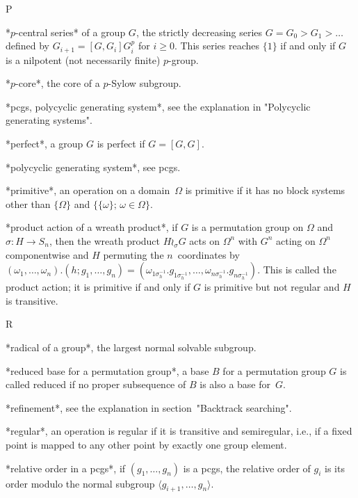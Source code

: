  P

*$p$-central series* of a group $G$, the strictly  decreasing series $G =
G_0 > G_1 > \ldots$ defined by $G_{i+1} = [G,G_i]G_i^p$ for $i\ge0$. This
series reaches $\{1\}$ if and only if $G$ is a nilpotent (not necessarily
finite) $p$-group.

*$p$-core*, the core of a $p$-Sylow subgroup.

*pcgs, polycyclic generating  system*, see the explanation in "Polycyclic
generating systems".

*perfect*, a group $G$ is perfect if $G=[G,G]$.

*polycyclic generating system*, see pcgs.

*primitive*, an operation on a domain~$\Omega$ is primitive  if it has no
block  systems other  than   $\{\Omega\}$  and  $\{\{\omega\};\,\omega\in
\Omega\}$.

*product  action of a wreath  product*, if $G$  is a permutation group on
$\Omega$  and    $\sigma\colon H\to    S_n$,   then  the  wreath  product
$H\wr_\sigma G$ acts   on  $\Omega^n$ with  $G^n$  acting on   $\Omega^n$
componentwise     and      $H$  permuting     the    $n$~coordinates   by
$(\omega_1,\ldots,\omega_n).               (h;g_1,\ldots,g_n)           =
(\omega_{1\sigma_h^{-1}}.             g_{1\sigma_h^{-1}},         \ldots,
\omega_{n\sigma_h^{-1}}. g_{n\sigma_h^{-1}})$. This is called the product
action; it is primitive if  and only if  $G$ is primitive but not regular
and $H$ is transitive.

 R

*radical of a group*, the largest normal solvable subgroup.

*reduced  base  for a permutation group*,  a  base  $B$ for a permutation
group  $G$ is called reduced  if no proper subsequence of  $B$  is also a
base for~$G$.

*refinement*, see the explanation in section~"Backtrack searching".

*regular*, an  operation is regular if  it is transitive and semiregular,
i.e., if a fixed point is mapped to any other point  by exactly one group
element.

*relative order in a pcgs*, if $(g_1,\ldots,g_n)$ is a pcgs, the relative
order    of $g_i$   is   its    order     modulo the  normal     subgroup
$\langle g_{i+1},\ldots,g_n\rangle$.

